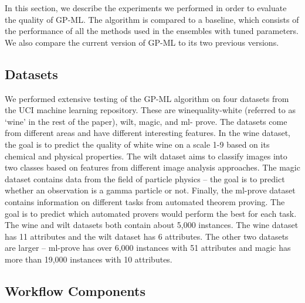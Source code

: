 \documentclass{ws-ijait}
\begin{document}
In this section, we describe the experiments we performed in order to evaluate
the quality of GP-ML. The algorithm is compared to a baseline, which consists of
the performance of all the methods used in the ensembles with tuned parameters.
We also compare the current version of GP-ML to its two previous
versions\cite{SSCI2015,7814654}.

\subsection{Datasets}

We performed extensive testing of the GP-ML algorithm on four datasets from the
UCI machine learning repository\cite{Lichman:2013}. These are 
winequality-white\cite{Cortez2009547} (referred to as `wine' in the rest of the paper),
wilt\cite{Johnson:2013:HPA:2512892.2512894}, magic\cite{Bock2004511},  and ml-
prove\cite{Bridge}. The datasets come from different areas and have  different
interesting features. In the wine dataset, the goal is to predict  the quality
of white wine on a scale 1-9 based on its chemical and physical  properties. The
wilt dataset aims to classify images into two classes based on features from
different image analysis approaches. The magic dataset contains  data from the
field of particle physics -- the goal is to predict whether an observation is a
gamma particle or not. Finally, the ml-prove dataset contains information on
different tasks from automated theorem proving. The goal is to  predict which
automated provers would perform the best for each task. The wine and wilt
datasets both contain about 5,000 instances. The wine dataset has 11 attributes
and the wilt dataset has 6 attributes. The other two datasets are larger -- 
ml-prove has over 6,000 instances with 51 attributes and magic has more than 
19,000 instances with 10 attributes.

\subsection{Workflow Components}
\end{document}

